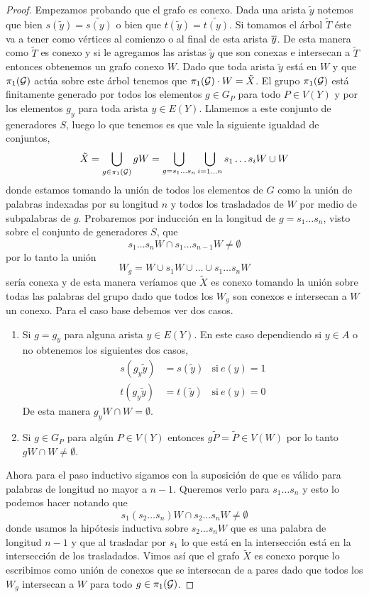 \documentclass[tesis.tex]{subfiles}
\newcommand{\cG}{ {\cal G} }
\begin{document}
\begin{proof}
	Empezamos probando que el grafo es conexo.
	Dada una arista $\tilde y$ notemos que bien $s(\tilde y) = \widetilde{s(y)}$ o bien que $t(\tilde y) = \widetilde{t(y)}$.
	Si tomamos el árbol $\tilde T$ éste va a tener como vértices al comienzo o al final de esta arista $\overline y$.
	De esta manera como $\tilde T$ es conexo y si le agregamos las aristas $\tilde y$ que son conexas e intersecan a $\tilde T$ entonces obtenemos un grafo conexo $W$.
	Dado que toda arista $\tilde y$ está en $W$ y que $\pi_1(\cG)$ actúa sobre este árbol tenemos que $\pi_1(\cG) \cdot W = \tilde X$.
	El grupo $\pi_1(\cG)$ está finitamente generado por todos los elementos $g \in G_P$ para todo $P \in V(Y)$ y por los elementos $g_y$ para toda arista $y \in E(Y)$.
	Llamemos a este conjunto de generadores $S$, luego lo que tenemos es que vale la siguiente igualdad de conjuntos,
	\[
		\tilde X = \bigcup_{g \in \pi_1(\cG)} gW = \bigcup_{g=s_1 \dots s_n} \bigcup_{i=1 \dots n} s_{1}\dots s_{i} W  \cup W 
	\]  
	donde estamos tomando la unión de todos los elementos de $G$ como la unión de palabras indexadas por su longitud $n$ y todos los trasladados de $W$ por medio de subpalabras de $g$.
	Probaremos por inducción en la longitud de $g=s_1\dots s_n$, visto sobre el conjunto de generadores $S$, que 
	\[
		s_1\dots s_n W \cap s_1 \dots s_{n-1}W \neq \emptyset	
	\] 
	por lo tanto la unión 
	\[
	W_g = W \cup s_1W \cup \dots \cup s_1\dots s_{n}W
	\]
	sería conexa y de esta manera veríamos que $\tilde X$ es conexo tomando la unión sobre todas las palabras del grupo dado que todos los $W_g$ son conexos e intersecan a $W$ un conexo.
	Para el caso base debemos ver dos casos.
	\begin{enumerate}
		\item Si $g=g_y$ para alguna arista $y \in E(Y)$.
		En este caso dependiendo si $y \in A$ o no obtenemos los siguientes dos casos,
		\begin{align*}
			s(g_y \tilde y) &= s(\tilde y)   & \text{si} \ e(y) = 1 \\
			t(g_y \tilde y) &= t(\tilde y)   & \text{si} \ e(y) = 0 
		\end{align*}
		De esta manera $g_yW \cap W = \emptyset$.
		\item Si $g \in G_P$ para algún $P \in V(Y)$ entonces $g\tilde P = \tilde P \in V(W)$ por lo tanto $gW \cap W \neq \emptyset$. 
	\end{enumerate} 
	Ahora para el paso inductivo sigamos con la suposición de que es válido para palabras de longitud no mayor a $n-1$. 
	Queremos verlo para $s_1\dots s_n$ y esto lo podemos hacer notando que 
	\[
	s_1(s_2 \dots s_n) W \cap s_2 \dots s_{n} W \neq \emptyset 
	\]
	donde usamos la hipótesis inductiva sobre $s_2 \dots s_n W$ que es una palabra de longitud $n-1$ y que al trasladar por $s_1$ lo que está en la intersección está en la intersección de los trasladados.
	Vimos así que el grafo $\tilde X$ es conexo porque lo escribimos como unión de conexos que se intersecan de a pares dado que todos los $W_g$ intersecan a $W$ para todo $g \in \pi_1(\cG)$.
	

\end{proof}
\end{document}
